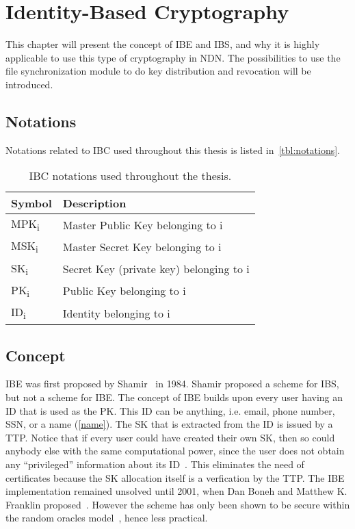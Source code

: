 \chapter{Identity-Based Cryptography}\label{chp:ibc}
This chapter will present the concept of \gls{IBE} and \gls{IBS}, and why it is highly applicable to use this type of cryptography in \gls{NDN}. 
The possibilities to use the file synchronization module to do key distribution and revocation will be introduced.

\section{Notations}
Notations related to \gls{IBC} used throughout this thesis is listed in~\autoref{tbl:notations}.
\begin{table}[h]
  \begin{tabular}[c]{p{}p{}}
  \hline
  Symbol                    & Description                               \\ \hline
  MPK\textsubscript{i}      & Master Public Key belonging to i          \\ %
  MSK\textsubscript{i}      & Master Secret Key belonging to i          \\ %
  SK\textsubscript{i}       & Secret Key (private key) belonging to i   \\ %
  PK\textsubscript{i}       & Public Key belonging to i                 \\ %
  ID\textsubscript{i}       & Identity belonging to i                   \\ %
  \end{tabular}
  \caption[IBC Notations]{IBC notations used throughout the thesis.}
  \label{tbl:notations}
\end{table}

\section{Concept}\label{ibc}
\gls{IBE} was first proposed by Shamir~\cite{DBLP:conf/crypto/Shamir84} in 1984. 
Shamir proposed a scheme for \gls{IBS}, but not a scheme for \gls{IBE}. 
The concept of \gls{IBE} builds upon every user having an \gls{ID} that is used as the \gls{PK}. 
This \gls{ID} can be anything, i.e. email, phone number, \gls{SSN}, or a \gls{name} (\autoref{name}).
The \gls{SK} that is extracted from the \gls{ID} is issued by a \gls{TTP}.
Notice that if every user could have created their own \gls{SK}, then so could anybody else with the same computational power, since the user does not obtain any ``privileged'' information about its \gls{ID}~\cite{Bidgoli06}.
This eliminates the need of certificates because the \gls{SK} allocation itself is a verfication by the \gls{TTP}.
The \gls{IBE} implementation remained unsolved until 2001, when Dan Boneh and Matthew K. Franklin proposed~\cite{DBLP:conf/crypto/BonehF01}.
However the scheme has only been shown to be secure within the random oracles model~\cite{DBLP:journals/iacr/Waters04}, hence less practical.

